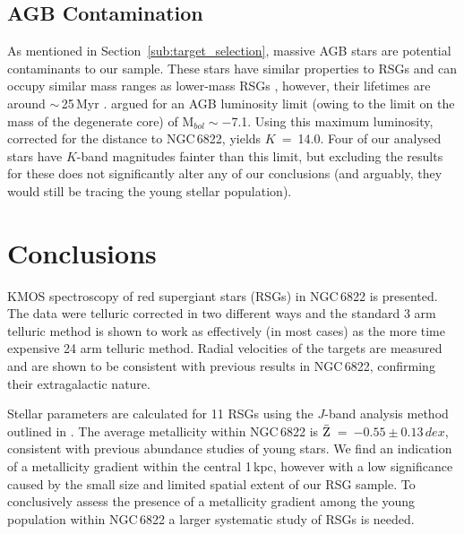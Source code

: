 
\subsection{AGB Contamination} %
\label{sub:AGB_contamination}
As mentioned in Section~\ref{sub:target_selection}, massive AGB stars are potential contaminants to our sample.
These stars have similar properties to RSGs and can occupy similar mass ranges as lower-mass RSGs
\citep{2005ARA&A..43..435H},
however, their lifetimes are around $\sim$\,25\,Myr
\citep{2010MNRAS.401.1453D}.
\cite{1983ApJ...272...99W} argued for an AGB luminosity limit
(owing to the limit on the mass of the degenerate core) of M$_{bol}\sim -$7.1.
Using this maximum luminosity, corrected for the distance to NGC\,6822,
yields $K$~=~14.0.
Four of our analysed stars have $K$-band magnitudes fainter than this limit,
but excluding the results for these does not significantly alter any of our conclusions
(and arguably, they would still be tracing the young stellar population).


\section{Conclusions} %
\label{sec:conclusions}

KMOS spectroscopy of red supergiant stars (RSGs) in NGC\,6822 is presented.
The data were telluric corrected in two different ways and the standard 3 arm telluric method is shown to work as effectively (in most cases) as the more time expensive 24 arm telluric method.
Radial velocities of the targets are measured and are shown to be consistent with previous results in NGC\,6822, confirming their extragalactic nature.

Stellar parameters are calculated for 11 RSGs using the $J$-band analysis method outlined in
\cite{2010MNRAS.407.1203D}.
The average metallicity within NGC\,6822 is
$\bar{\rm Z}$~=~$-0.55\pm0.13\,dex$,
consistent with previous abundance studies of young stars.
We find an indication of a metallicity gradient within the central 1\,kpc,
however with a low significance caused by the small size and limited spatial extent of our RSG sample.
To conclusively assess the presence of a metallicity gradient among the young population within NGC\,6822 a larger systematic study of RSGs is needed.

